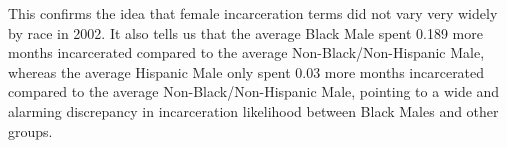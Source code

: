 \documentclass[11pt]{amsart}
\numberwithin{equation}{section}
\numberwithin{figure}{section}
\numberwithin{theorem}{section}
\begin{document}
This confirms the idea that female incarceration terms did not vary very widely by race in 2002. It also tells us that the average Black Male spent 0.189 more months incarcerated compared to the average Non-Black/Non-Hispanic Male, whereas the average Hispanic Male only spent 0.03 more months incarcerated compared to the average Non-Black/Non-Hispanic Male, pointing to a wide and alarming discrepancy in incarceration likelihood between Black Males and other groups.
\end{document}

